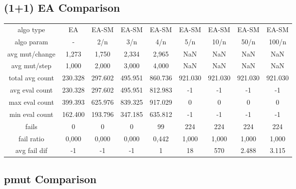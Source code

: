 
\subsection{(1+1) EA Comparison}


\begin{tabular}[h]{ccccccccc}
algo type&             EA&   EA-SM&   EA-SM&   EA-SM&   EA-SM&   EA-SM&   EA-SM&   EA-SM\\
algo param&             -&     2/n&     3/n&     4/n&     5/n&    10/n&    50/n&   100/n\\
avg mut/change&     1,273&   1,750&   2,334&   2,965&     NaN&     NaN&     NaN&     NaN\\
avg mut/step&       1,000&   2,000&   3,000&   4,000&     NaN&     NaN&     NaN&     NaN\\
\hline
total avg count&  230.328& 297.602& 495.951& 860.736& 921.030& 921.030& 921.030& 921.030\\
avg eval count&   230.328& 297.602& 495.951& 812.983&      -1&      -1&      -1&      -1\\
max eval count&   399.393& 625.976& 839.325& 917.029&       0&       0&       0&       0\\
min eval count&   162.400& 193.796& 347.185& 635.812&      -1&      -1&      -1&      -1\\
\hline
fails&                  0&       0&       0&      99&     224&     224&     224&     224\\
fail ratio&         0,000&   0,000&   0,000&   0,442&   1,000&   1,000&   1,000&   1,000\\
avg fail dif&          -1&      -1&      -1&       1&      18&     570&   2.488&   3.115\\
\end{tabular}


\subsection{pmut Comparison}


